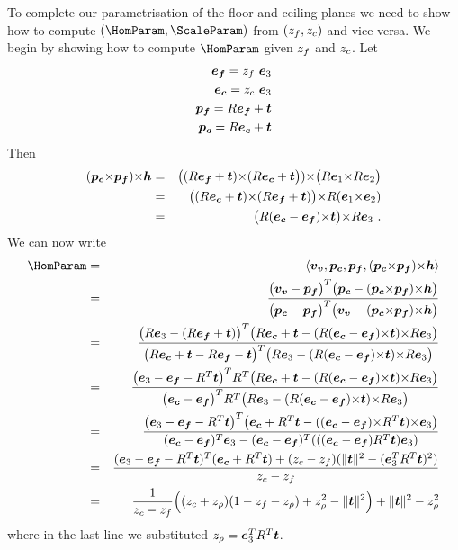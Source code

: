To complete our parametrisation of the floor and ceiling planes we
need to show how to compute $(\HomParam,\ScaleParam)$ from
$(\zfloor,\zceil)$ and vice versa. We begin by showing how to compute
$\HomParam$ given $\zfloor$ and $\zceil$. Let
\begin{eqnarray}
  \efloor = \zfloor ~ \ez \\
  \eceil = \zceil ~ \ez \\
  \pfloor = \RetProj{\efloor} \\
  \pceil = \RetProj{\eceil}
\end{eqnarray}
Then
\begin{eqnarray}
  (\pceil \cross \pfloor) \cross \horizon &=&
    \bigl((\RetProj{\efloor}) \cross (\RetProj{\eceil}\bigr))
    \cross
    \bigl(\CamR\ex \cross
          \CamR\ey \bigr)\\
  &=& \bigl( (\RetProj{\eceil}) \cross (\RetProj{\efloor}) \bigr)
      \cross
      \CamR(\ex\cross\ey) \\
  &=& \bigl( \CamR(\eceil-\efloor)\cross\CamTr \bigr)
      \cross
      \CamR\ez ~. \\
\end{eqnarray}
We can now write
\begin{eqnarray}
  \HomParam &=& 
    \langle\vvpt,\pceil,\pfloor,(\pceil\cross\pfloor)\cross\horizon\rangle \\
  &=& \frac{
    \bigl(\vvpt-\pfloor\bigr)^T
    \bigl(\pceil-(\pceil\cross\pfloor)\cross\horizon\bigr)
   }{
    \bigl(\pceil-\pfloor\bigr)^T
    \bigl(\vvpt-(\pceil\cross\pfloor)\cross\horizon\bigr)
   }\\
  &=& \frac{
    \bigl(\CamR\ez - (\CamR\efloor+\CamTr)\bigr)^T
    \bigl(\CamR\eceil+\CamTr-
          (\CamR(\eceil-\efloor)\cross\CamTr)\cross\CamR\ez
          \bigr)
   }{
    \bigl(\CamR\eceil+\CamTr-\CamR\efloor-\CamTr\bigr)^T
    \bigl(\CamR\ez-
          (\CamR(\eceil-\efloor)\cross\CamTr)\cross\CamR\ez
          \bigr)
   }\\
  &=& \frac{
    \bigl(\ez - \efloor - \CamR^T\CamTr\bigr)^T R^T
    \bigl(\CamR\eceil+\CamTr-
          (\CamR(\eceil-\efloor)\cross\CamTr)\cross\CamR\ez
          \bigr)
   }{
    \bigl(\eceil-\efloor\bigr)^T R^T
    \bigl(\CamR\ez-
          (\CamR(\eceil-\efloor)\cross\CamTr)\cross\CamR\ez
          \bigr)
   }\\
  &=& \frac{
    \bigl(\ez - \efloor - \CamR^T\CamTr\bigr)^T
    \bigl(\eceil + \CamR^T\CamTr -
          ((\eceil-\efloor)\cross\CamR^T\CamTr)\cross\ez
          \bigr)
   }{
    (\eceil-\efloor)^T\ez -
    (\eceil-\efloor)^T(((\eceil-\efloor)\CamR^T\CamTr)\ez)
   }\\
  &=& \frac{
    (\ez-\efloor-\CamR^T\CamTr)^T(\eceil+\CamR^T\CamTr)
    +(\zceil-\zfloor)(\|\CamTr\|^2 - (\ez^T\CamR^T\CamTr)^2)
   }{
    \zceil-\zfloor
   }\\
  &=& \frac{1}{\zceil-\zfloor}
    \Bigl( (\zceil + \zcam)(1-\zfloor-\zcam) + \zcam^2 - \|\CamTr\|^2 \Bigr)
     + \|\CamTr\|^2 - \zcam^2
\end{eqnarray}
where in the last line we substituted $\zcam =
\ez^T\CamR^T\CamTr$.

